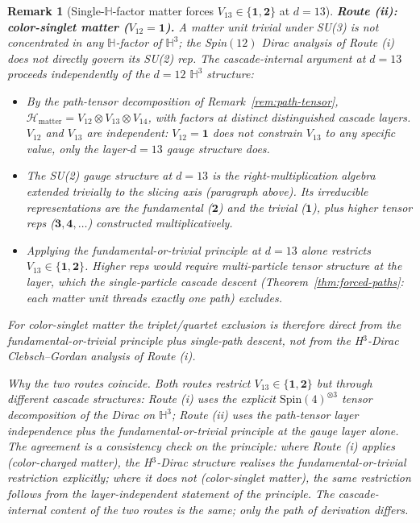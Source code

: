 \documentclass[12pt,a4paper]{article}
\newtheorem{remark}[theorem]{Remark}
\begin{document}
\begin{remark}[Single-$\mathbb{H}$-factor matter forces $V_{13}\in\{\mathbf{1},\mathbf{2}\}$ at $d=13$]
\medskip\noindent\textbf{Route (ii): color-singlet matter ($V_{12}=\mathbf{1}$).}
A matter unit trivial under SU(3) is not concentrated in any
$\mathbb{H}$-factor of $\mathbb{H}^3$; the Spin$(12)$ Dirac analysis of
Route (i) does not directly govern its SU(2) rep. The cascade-internal
argument at $d=13$ proceeds independently of the $d=12$ $\mathbb{H}^3$
structure:
\begin{itemize}
\item By the path-tensor decomposition of
Remark~\ref{rem:path-tensor},
$\mathcal{H}_{\text{matter}}=V_{12}\otimes V_{13}\otimes V_{14}$, with
factors at distinct distinguished cascade layers. $V_{12}$ and
$V_{13}$ are independent: $V_{12}=\mathbf{1}$ does not constrain
$V_{13}$ to any specific value, only the layer-$d=13$ gauge structure does.
\item The SU(2) gauge structure at $d=13$ is the
right-multiplication algebra extended trivially to the slicing axis
(paragraph above). Its irreducible representations are the
fundamental ($\mathbf{2}$) and the trivial ($\mathbf{1}$), plus higher
tensor reps ($\mathbf{3},\mathbf{4},\dots$) constructed multiplicatively.
\item Applying the fundamental-or-trivial principle at $d=13$ alone
restricts $V_{13}\in\{\mathbf{1},\mathbf{2}\}$. Higher reps would
require multi-particle tensor structure at the layer, which the
single-particle cascade descent (Theorem~\ref{thm:forced-paths}: each
matter unit threads exactly one path) excludes.
\end{itemize}
For color-singlet matter the triplet/quartet exclusion is therefore
\emph{direct from the fundamental-or-trivial principle plus
single-path descent}, not from the H$^3$-Dirac Clebsch--Gordan analysis
of Route (i).

\medskip\noindent\emph{Why the two routes coincide.} Both routes
restrict $V_{13}\in\{\mathbf{1},\mathbf{2}\}$ but through different
cascade structures: Route (i) uses the explicit
$\mathrm{Spin}(4)^{\otimes 3}$ tensor decomposition of the Dirac on
$\mathbb{H}^3$; Route (ii) uses the path-tensor layer independence
plus the fundamental-or-trivial principle at the gauge layer alone.
The agreement is a consistency check on the principle: where Route (i)
applies (color-charged matter), the H$^3$-Dirac structure realises the
fundamental-or-trivial restriction explicitly; where it does not
(color-singlet matter), the same restriction follows from the
layer-independent statement of the principle. The cascade-internal
content of the two routes is the same; only the path of derivation
differs.


\end{remark}
\end{document}
